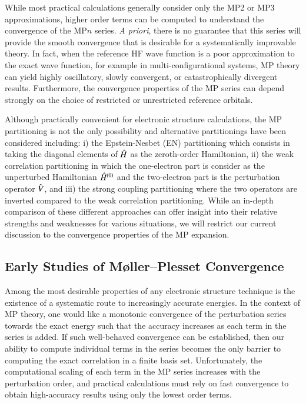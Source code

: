 \documentclass[aps,prb,reprint,noshowkeys,superscriptaddress]{revtex4-1}
\newcommand{\hH}{\Hat{H}}
\newcommand{\hV}{\Hat{V}}
\begin{document}
While most practical calculations generally consider only the MP2 or MP3 approximations, higher order terms can 
be computed to understand the convergence of the MP$n$ series.\cite{Handy_1985}
\textit{A priori}, there is no guarantee that this series will provide the smooth convergence that is desirable for a
systematically improvable theory.
In fact, when the reference HF wave function is a poor approximation to the exact wave function, 
for example in multi-configurational systems, MP theory can yield highly oscillatory, 
slowly convergent, or catastrophically divergent results.\cite{Gill_1986,Gill_1988,Handy_1985,Lepetit_1988,Leininger_2000}
Furthermore, the convergence properties of the MP series can depend strongly on the choice of restricted or
unrestricted reference orbitals.

Although practically convenient for electronic structure calculations, the MP partitioning is not 
the only possibility and alternative partitionings have been considered including: 
i) the Epstein-Nesbet (EN) partitioning which consists in taking the diagonal elements of $\hH$ as the zeroth-order Hamiltonian, \cite{Nesbet_1955,Epstein_1926} 
ii) the weak correlation partitioning in which the one-electron part is consider as the unperturbed Hamiltonian $\hH^{(0)}$ and the two-electron part is the perturbation operator $\hV$, and 
iii) the strong coupling partitioning where the two operators are inverted compared to the weak correlation partitioning. \cite{Seidl_2018}
While an in-depth comparison of these different approaches can offer insight into 
their relative strengths and weaknesses for various situations, we will restrict our current discussion
to the convergence properties of the MP expansion.

\subsection{Early Studies of M{\o}ller--Plesset Convergence} %

Among the most desirable properties of any electronic structure technique is the existence of 
a systematic route to increasingly accurate energies. 
In the context of MP theory, one would like a monotonic convergence of the perturbation
series towards the exact energy such that the accuracy increases as each term in the series is added.
If such well-behaved convergence can be established, then our ability to compute individual 
terms in the series becomes the only barrier to computing the exact correlation in a finite basis set.
Unfortunately, the computational scaling of each term in the MP series increases with the perturbation
order, and practical calculations must rely on fast convergence
to obtain high-accuracy results using only the lowest order terms.
\end{document}
